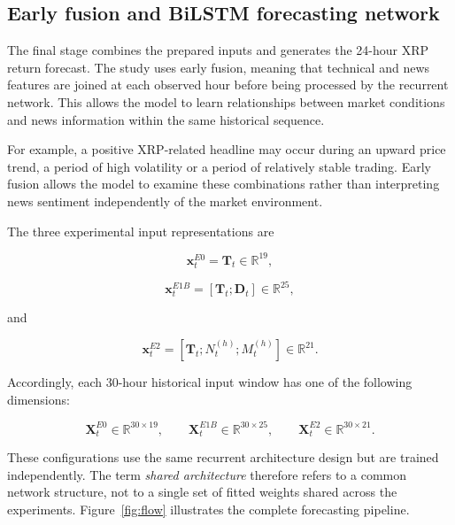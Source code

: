 \subsection{Early fusion and BiLSTM forecasting network}
\label{sec:method_predictor}

The final stage combines the prepared inputs and generates the 24-hour XRP return forecast. The study uses early fusion, meaning that technical and news features are joined at each observed hour before being processed by the recurrent network. This allows the model to learn relationships between market conditions and news information within the same historical sequence.

For example, a positive XRP-related headline may occur during an upward price trend, a period of high volatility or a period of relatively stable trading. Early fusion allows the model to examine these combinations rather than interpreting news sentiment independently of the market environment.

The three experimental input representations are

\begin{equation}
\mathbf{x}_t^{E0}
=
\mathbf{T}_t
\in\mathbb{R}^{19},
\label{eq:e0_input}
\end{equation}

\begin{equation}
\mathbf{x}_t^{E1B}
=
\left[
\mathbf{T}_t;
\mathbf{D}_t
\right]
\in\mathbb{R}^{25},
\label{eq:e1b_input}
\end{equation}

and

\begin{equation}
\mathbf{x}_t^{E2}
=
\left[
\mathbf{T}_t;
N_t^{(h)};
M_t^{(h)}
\right]
\in\mathbb{R}^{21}.
\label{eq:e2_input}
\end{equation}

Accordingly, each 30-hour historical input window has one of the following dimensions:

\begin{equation}
\mathbf{X}_t^{E0}\in\mathbb{R}^{30\times19},
\qquad
\mathbf{X}_t^{E1B}\in\mathbb{R}^{30\times25},
\qquad
\mathbf{X}_t^{E2}\in\mathbb{R}^{30\times21}.
\label{eq:input_dimensions}
\end{equation}

These configurations use the same recurrent architecture design but are trained independently. The term \emph{shared architecture} therefore refers to a common network structure, not to a single set of fitted weights shared across the experiments. Figure~\ref{fig:flow} illustrates the complete forecasting pipeline.

